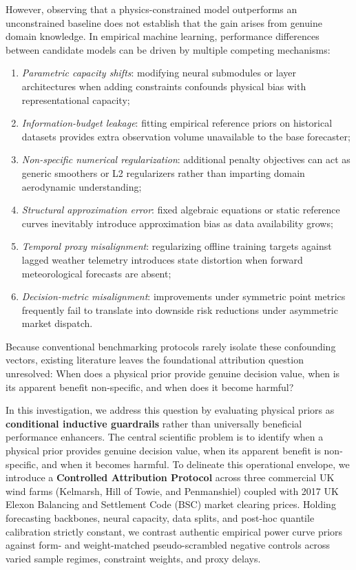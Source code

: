 However, observing that a physics-constrained model outperforms an unconstrained baseline does not establish that the gain arises from genuine domain knowledge. In empirical machine learning, performance differences between candidate models can be driven by multiple competing mechanisms:
\begin{enumerate}[label=(\alph*),leftmargin=*]
\item \textit{Parametric capacity shifts}: modifying neural submodules or layer architectures when adding constraints confounds physical bias with representational capacity;
\item \textit{Information-budget leakage}: fitting empirical reference priors on historical datasets provides extra observation volume unavailable to the base forecaster;
\item \textit{Non-specific numerical regularization}: additional penalty objectives can act as generic smoothers or L2 regularizers rather than imparting domain aerodynamic understanding;
\item \textit{Structural approximation error}: fixed algebraic equations or static reference curves inevitably introduce approximation bias as data availability grows;
\item \textit{Temporal proxy misalignment}: regularizing offline training targets against lagged weather telemetry introduces state distortion when forward meteorological forecasts are absent;
\item \textit{Decision-metric misalignment}: improvements under symmetric point metrics frequently fail to translate into downside risk reductions under asymmetric market dispatch.
\end{enumerate}
Because conventional benchmarking protocols rarely isolate these confounding vectors, existing literature leaves the foundational attribution question unresolved: When does a physical prior provide genuine decision value, when is its apparent benefit non-specific, and when does it become harmful?

In this investigation, we address this question by evaluating physical priors as \textbf{conditional inductive guardrails} rather than universally beneficial performance enhancers. The central scientific problem is to identify when a physical prior provides genuine decision value, when its apparent benefit is non-specific, and when it becomes harmful. To delineate this operational envelope, we introduce a \textbf{Controlled Attribution Protocol} across three commercial UK wind farms (Kelmarsh, Hill of Towie, and Penmanshiel) coupled with 2017 UK Elexon Balancing and Settlement Code (BSC) market clearing prices. Holding forecasting backbones, neural capacity, data splits, and post-hoc quantile calibration strictly constant, we contrast authentic empirical power curve priors against form- and weight-matched pseudo-scrambled negative controls across varied sample regimes, constraint weights, and proxy delays.

